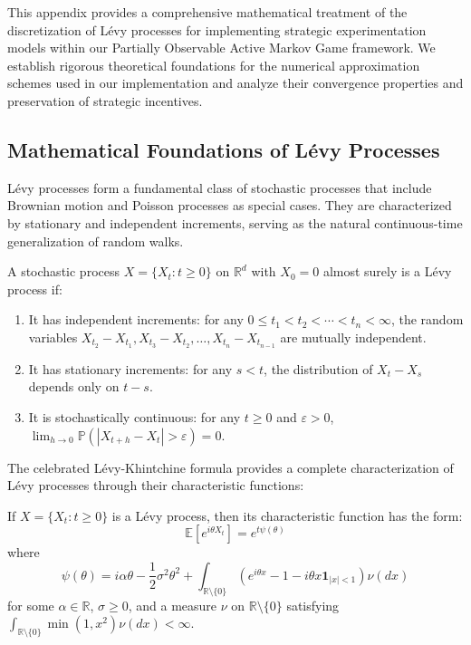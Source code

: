 This appendix provides a comprehensive mathematical treatment of the discretization of Lévy processes for implementing strategic experimentation models within our Partially Observable Active Markov Game framework. We establish rigorous theoretical foundations for the numerical approximation schemes used in our implementation and analyze their convergence properties and preservation of strategic incentives.

\subsection{Mathematical Foundations of Lévy Processes}
\label{appendix:levy_foundations}

Lévy processes form a fundamental class of stochastic processes that include Brownian motion and Poisson processes as special cases. They are characterized by stationary and independent increments, serving as the natural continuous-time generalization of random walks.

\begin{definition}
    A stochastic process $X = \{X_t : t \geq 0\}$ on $\mathbb{R}^d$ with $X_0 = 0$ almost surely is a Lévy process if:
    \begin{enumerate}
        \item It has independent increments: for any $0 \leq t_1 < t_2 < \cdots < t_n < \infty$, the random variables $X_{t_2} - X_{t_1}, X_{t_3} - X_{t_2}, \ldots, X_{t_n} - X_{t_{n-1}}$ are mutually independent.
        \item It has stationary increments: for any $s < t$, the distribution of $X_t - X_s$ depends only on $t-s$.
        \item It is stochastically continuous: for any $t \geq 0$ and $\varepsilon > 0$, $\lim_{h \to 0} \mathbb{P}(|X_{t+h} - X_t| > \varepsilon) = 0$.
    \end{enumerate}
\end{definition}

The celebrated Lévy-Khintchine formula provides a complete characterization of Lévy processes through their characteristic functions:

\begin{theorem}
    If $X = \{X_t : t \geq 0\}$ is a Lévy process, then its characteristic function has the form:
    \begin{equation}
        \mathbb{E}[e^{i\theta X_t}] = e^{t\psi(\theta)}
    \end{equation}
    where
    \begin{equation}
        \psi(\theta) = i\alpha\theta - \frac{1}{2}\sigma^2\theta^2 + \int_{\mathbb{R}\setminus\{0\}} (e^{i\theta x} - 1 - i\theta x\mathbf{1}_{|x|<1})\nu(dx)
    \end{equation}
    for some $\alpha \in \mathbb{R}$, $\sigma \geq 0$, and a measure $\nu$ on $\mathbb{R}\setminus\{0\}$ satisfying $\int_{\mathbb{R}\setminus\{0\}} \min(1, x^2)\nu(dx) < \infty$.
\end{theorem}

